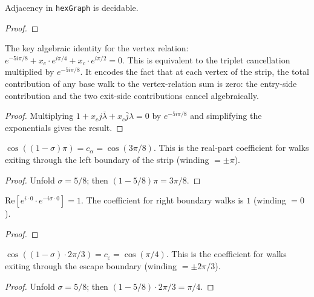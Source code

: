 \begin{lemma}\label{lem:decidable_adj}
\leanok
{}
  Adjacency in \texttt{hexGraph} is decidable.
\end{lemma}
\begin{proof}
\leanok
\end{proof}

\begin{theorem}\label{thm:vertex_phase}
\leanok
{}
  The key algebraic identity for the vertex relation:
  $e^{-5i\pi/8} + x_c \cdot e^{i\pi/4} + x_c \cdot e^{i\pi/2} = 0.$
  This is equivalent to the triplet cancellation multiplied by $e^{-5i\pi/8}$.
  It encodes the fact that at each vertex of the strip, the total contribution
  of any base walk to the vertex-relation sum is zero: the entry-side
  contribution and the two exit-side contributions cancel algebraically.
\end{theorem}
\begin{proof}
\leanok
  Multiplying $1 + x_c j \bar{\lambda} + x_c \bar{j} \lambda = 0$ by
  $e^{-5i\pi/8}$ and simplifying the exponentials gives the result.
\end{proof}

\begin{lemma}\label{lem:left_boundary_re}
\leanok
  $\cos((1-\sigma)\pi) = c_\alpha = \cos(3\pi/8)$.
  This is the real-part coefficient for walks exiting through the left boundary
  of the strip (winding $= \pm\pi$).
\end{lemma}
\begin{proof}
\leanok
  Unfold $\sigma = 5/8$; then $(1-5/8)\pi = 3\pi/8$.
\end{proof}

\begin{lemma}\label{lem:right_boundary_re}
\leanok
  $\mathrm{Re}[e^{i \cdot 0} \cdot e^{-i\sigma \cdot 0}] = 1$.
  The coefficient for right boundary walks is $1$ (winding $= 0$).
\end{lemma}
\begin{proof}
\leanok
\end{proof}

\begin{lemma}\label{lem:escape_boundary_re}
\leanok
  $\cos((1-\sigma) \cdot 2\pi/3) = c_\varepsilon = \cos(\pi/4)$.
  This is the coefficient for walks exiting through the escape boundary
  (winding $= \pm 2\pi/3$).
\end{lemma}
\begin{proof}
\leanok
  Unfold $\sigma = 5/8$; then $(1-5/8) \cdot 2\pi/3 = \pi/4$.
\end{proof}

